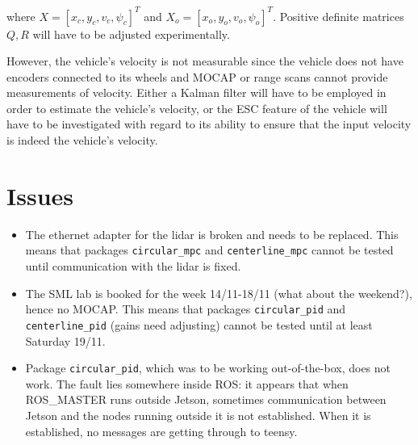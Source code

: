 \documentclass[oneside,12pt]{article}
\begin{document}
\begin{itemize}
    where $X=[x_c, y_c, v_c, \psi_c]^T$ and $X_o = [x_o, y_o, v_o, \psi_o]^T$.
    Positive definite matrices $Q,R$ will have to be adjusted experimentally.

    However, the vehicle's velocity is not measurable since the vehicle does not
    have encoders connected to its wheels and MOCAP or range scans cannot
    provide measurements of velocity. Either a Kalman filter will have to be
    employed in order to estimate the vehicle's velocity, or the ESC feature of
    the vehicle will have to be investigated with regard to its ability to
    ensure that the input velocity is indeed the vehicle's velocity.
\end{itemize}



\section{Issues}

\begin{itemize}
  \item The ethernet adapter for the lidar is broken and needs to be replaced.
    This means that packages \texttt{circular\_mpc} and \texttt{centerline\_mpc}
    cannot be tested until communication with the lidar is fixed.
  \item The SML lab is booked for the week 14/11-18/11 (what about the weekend?),
    hence no MOCAP. This means that packages \texttt{circular\_pid} and
    \texttt{centerline\_pid} (gains need adjusting) cannot be tested until at
    least Saturday 19/11.
  \item Package \texttt{circular\_pid}, which was to be working out-of-the-box,
    does not work. The fault lies somewhere inside ROS: it appears that when
    ROS\_MASTER runs outside Jetson, sometimes communication between Jetson and the
    nodes running outside it is not established. When it is established, no
    messages are getting through to teensy.
\end{itemize}
\end{document}
